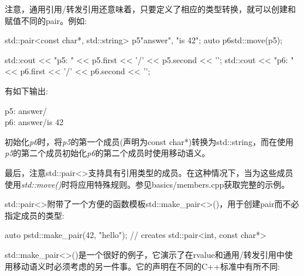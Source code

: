 注意，通用引用/转发引用还意味着，只要定义了相应的类型转换，就可以创建和赋值不同的pair。例如:\par

\begin{codebox}[cpp]
std::pair<const char*, std::string> p5{"answer", "is 42"};
auto p6{std::move(p5)};

std::cout << "p5: " << p5.first << '/' << p5.second << '\n';
std::cout << "p6: " << p6.first << '/' << p6.second << '\n';
\end{codebox}

有如下输出:\par

\begin{myOutput}
p5: answer/ \\
p6: answer/is 42
\end{myOutput}

初始化\textit{p6}时，将\textit{p5}的第一个成员(声明为const char*)转换为std::string，而在使用\textit{p5}的第二个成员初始化\textit{p6}的第二个成员时使用移动语义。\par

最后，注意std::pair<>支持具有引用类型的成员。在这种情况下，当为这些成员使用\textit{std::move()}时将应用特殊规则。参见basics/members.cpp获取完整的示例。\par


std::pair<>附带了一个方便的函数模板std::make\_pair<>()，用于创建pair而不必指定成员的类型:\par

\begin{codebox}[cpp]
auto p{std::make_pair(42, "hello")}; // creates std::pair<int, const char*>
\end{codebox}

std::make\_pair<>()是一个很好的例子，它演示了在rvalue和通用/转发引用中使用移动语义时必须考虑的另一件事。它的声明在不同的C++标准中有所不同:\par

